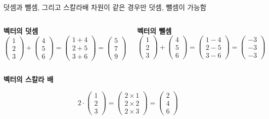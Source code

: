 \documentclass[10pt,t]{beamer}
\begin{document}
\begin{frame}[fragile]{덧셈과 뺄셈, 그리고 스칼라배}
    차원이 같은 경우만 덧셈, 뺄셈이 가능함\\[3em]
\begin{columns}
\textbf{벡터의 덧셈}
    \[\begin{pmatrix}
        1 \\
        2\\
        3
    \end{pmatrix} + \begin{pmatrix}
        4\\
        5\\
        6
    \end{pmatrix} = \begin{pmatrix}
        1+4 \\
        2+5 \\
        3+6 
    \end{pmatrix} = \begin{pmatrix}
        5 \\
        7 \\
        9 
    \end{pmatrix}\]

    \textbf{벡터의 뺄셈}
    \[\begin{pmatrix}
        1 \\
        2\\
        3
    \end{pmatrix} + \begin{pmatrix}
        4\\
        5\\
        6
    \end{pmatrix} = \begin{pmatrix}
        1-4 \\
        2-5 \\
        3-6 
    \end{pmatrix} = \begin{pmatrix}
        -3 \\
        -3 \\
        -3 
    \end{pmatrix}\]

    
\end{columns}
\begin{center}
    \textbf{벡터의 스칼라 배}    
\end{center}
    \[
        2 \cdot \begin{pmatrix}
        1 \\
        2\\
        3
    \end{pmatrix} = \begin{pmatrix}
        2\times1 \\
        2\times2 \\
        2\times3 
    \end{pmatrix} = \begin{pmatrix}
        2 \\
        4 \\
        6 
    \end{pmatrix}\]

\end{frame}
\end{document}
